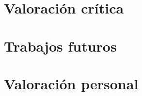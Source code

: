 \documentclass[a4paper,11pt]{report}
\begin{document}
\lipsum[20]

\section{Valoración crítica}

\lipsum[21]

\section{Trabajos futuros}

\lipsum[22]

\section{Valoración personal}

\lipsum[23]


\clearpage
\printbibliography[heading=bibintoc,title={Referencias}]

\end{document}
